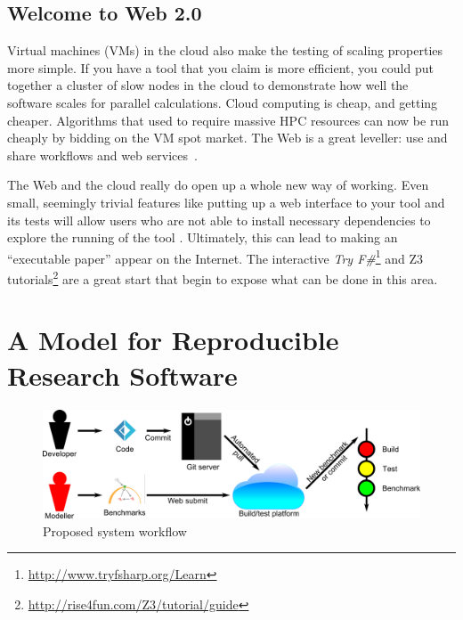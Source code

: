 \documentclass[a4paper,11pt]{article}
\begin{document}
\subsection{Welcome to Web 2.0}

Virtual machines (VMs) in the cloud also make the testing of scaling
properties more simple.  If you have a tool that you claim is more
efficient, you could put together a cluster of slow nodes in the cloud
to demonstrate how well the software scales for parallel calculations.
Cloud computing is cheap, and getting cheaper. Algorithms that used to
require massive HPC resources can now be run cheaply by bidding on the
VM spot market. The Web is a great leveller: use and share workflows
and web services~\cite{crick-et-al:2009b}.

 The Web and the
cloud really do open up a whole new way of working. Even small,
seemingly trivial features like putting up a web interface to your
tool and its tests will allow users who are not able to install
necessary dependencies to explore the running of the tool
\cite{Hall2014}. Ultimately, this can lead to making an ``executable
paper'' appear on the Internet. The interactive {\em Try
F\#}\footnote{\url{http://www.tryfsharp.org/Learn}} and Z3
tutorials\footnote{\url{http://rise4fun.com/Z3/tutorial/guide}} are a
great start that begin to expose what can be done in this area.


\section{A Model for Reproducible Research Software}\label{sec:Conclusion} 

\newline\newline

\begin{figure}[!ht]
\centering
\includegraphics[width=0.9\columnwidth]{images/workflow.png}
\caption{Proposed system workflow}
\label{fig:workflow} 
\end{figure}
\end{document}
